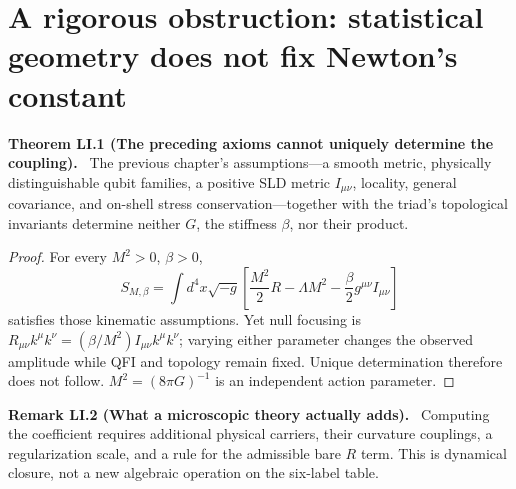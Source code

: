 \documentclass[11pt,a4paper,oneside]{book}
\newcommand{\statement}[3]{\par\medskip\noindent\textbf{#1 #2 (#3).}\ }
\begin{document}
\section{A rigorous obstruction: statistical geometry does not fix Newton's constant}
\statement{Theorem}{LI.1}{The preceding axioms cannot uniquely determine the coupling}
The previous chapter's assumptions---a smooth metric, physically distinguishable qubit families, a positive SLD metric $I_{\mu\nu}$, locality, general covariance, and on-shell stress conservation---together with the triad's topological invariants determine neither $G$, the stiffness $\beta$, nor their product.
\begin{proof}
For every $M^2>0$, $\beta>0$,
\begin{equation}S_{M,\beta}=\int d^4x\sqrt{-g}\left[\frac{M^2}2R-\Lambda M^2-\frac\beta2g^{\mu\nu}I_{\mu\nu}\right]\tag{253}\end{equation}
satisfies those kinematic assumptions. Yet null focusing is $R_{\mu\nu}k^\mu k^\nu=(\beta/M^2)I_{\mu\nu}k^\mu k^\nu$; varying either parameter changes the observed amplitude while QFI and topology remain fixed. Unique determination therefore does not follow. $M^2=(8\pi G)^{-1}$ is an independent action parameter.
\end{proof}
\statement{Remark}{LI.2}{What a microscopic theory actually adds}
Computing the coefficient requires additional physical carriers, their curvature couplings, a regularization scale, and a rule for the admissible bare $R$ term. This is dynamical closure, not a new algebraic operation on the six-label table.
\end{document}
